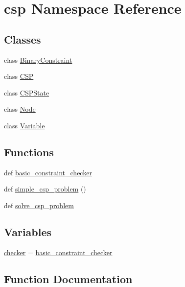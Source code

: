 \hypertarget{namespacecsp}{}\section{csp Namespace Reference}
\label{namespacecsp}
\subsection*{Classes}
\begin{DoxyCompactItemize}
\item 
class \hyperlink{classcsp_1_1_binary_constraint}{Binary\+Constraint}
\item 
class \hyperlink{classcsp_1_1_c_s_p}{C\+S\+P}
\item 
class \hyperlink{classcsp_1_1_c_s_p_state}{C\+S\+P\+State}
\item 
class \hyperlink{classcsp_1_1_node}{Node}
\item 
class \hyperlink{classcsp_1_1_variable}{Variable}
\end{DoxyCompactItemize}
\subsection*{Functions}
\begin{DoxyCompactItemize}
\item 
def \hyperlink{namespacecsp_ad32f960c74965165e11dded780a61aea}{basic\+\_\+constraint\+\_\+checker}
\item 
def \hyperlink{namespacecsp_a44b4e01fccb1ead68ca05c94eca176f0}{simple\+\_\+csp\+\_\+problem} ()
\item 
def \hyperlink{namespacecsp_a1c5d405433770dac8d183988546dc1ee}{solve\+\_\+csp\+\_\+problem}
\end{DoxyCompactItemize}
\subsection*{Variables}
\begin{DoxyCompactItemize}
\item 
\hyperlink{namespacecsp_a521f09aff5d0f231d9cf34d594c9fad1}{checker} = \hyperlink{namespacecsp_ad32f960c74965165e11dded780a61aea}{basic\+\_\+constraint\+\_\+checker}
\end{DoxyCompactItemize}


\subsection{Function Documentation}
\hypertarget{namespacecsp_ad32f960c74965165e11dded780a61aea}{}
